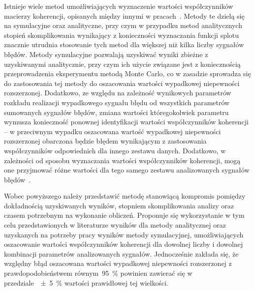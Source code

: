 Istnieje wiele metod umożliwiających wyznaczenie wartości współczynników macierzy koherencji, opisanych między innymi w pracach~\cite{jakubiec_redmono, jakubiec_reductive, jakubiec_system, batko_uncertainty}. Metody te dzielą się na symulacyjne oraz analityczne, przy czym w przypadku metod analitycznych stopień skomplikowania wynikający z konieczności wyznaczania funkcji splotu znacznie utrudnia stosowanie tych metod dla większej niż kilka liczby sygnałów błędów. Metody symulacyjne pozwalają uzyskiwać wyniki zbieżne z uzyskiwanymi analitycznie, przy czym ich użycie związane jest z koniecznością przeprowadzenia eksperymentu metodą Monte Carlo, co w zasadzie sprowadza się do zastosowania tej metody do oszacowania wartości wypadkowej niepewności rozszerzonej. Dodatkowo, ze względu na zależność wynikowych parametrów rozkładu realizacji wypadkowego sygnału błędu od wszystkich parametrów sumowanych sygnałów błędów, zmiana wartości któregokolwiek parametru wymusza konieczność ponownej identyfikacji wartości współczynników koherencji -- w przeciwnym wypadku oszacowana wartość wypadkowej niepewności rozszerzonej obarczona będzie błędem wynikającym z zastosowania współczynników odpowiednich dla innego zestawu danych. Dodatkowo, w zależności od sposobu wyznaczania wartości współczynników koherencji, mogą one przyjmować różne wartości dla tego samego zestawu analizowanych sygnałów błędów~\cite{jakubiec_redmono}.

Wobec powyższego należy przedstawić metodę stanowiącą kompromis pomiędzy dokładnością uzyskiwanych wyników, stopniem skomplikowania analizy oraz czasem potrzebnym na wykonanie obliczeń. Proponuje się wykorzystanie w tym celu przedstawionych w literaturze wyników dla metody analitycznej oraz uzyskanych na potrzeby pracy wyników metody symulacyjnej, umożliwiających oszacowanie wartości współczynników koherencji dla dowolnej liczby i dowolnej kombinacji parametrów analizowanych sygnałów. Jednocześnie zakłada się, że względny błąd oszacowana wartości wypadkowej niepewności rozszerzonej z prawdopodobieństwem równym~\qty{95}{\percent} powinien zawierać się w przedziale~\qty{\pm 5}{\percent} wartości prawidłowej tej wielkości.


